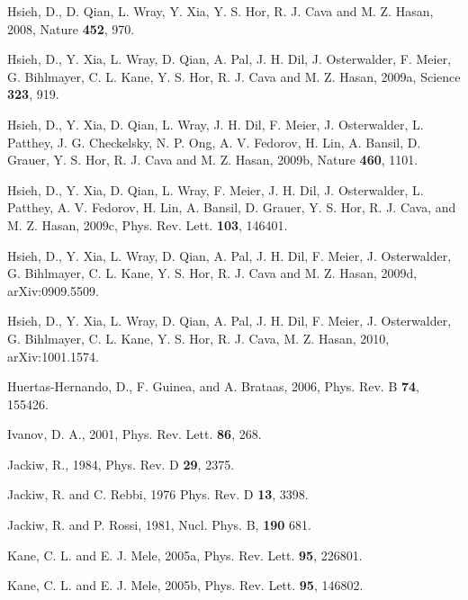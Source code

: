 \documentclass[twocolumn,floatfix,showpacs,rmp,aps]{revtex4}
\begin{document}
\begin{thebibliography}{99}
Hsieh, D., D. Qian, L. Wray, Y. Xia, Y. S. Hor, R. J. Cava and M. Z. Hasan, 2008,
Nature {\bf 452}, 970.

Hsieh, D., Y. Xia, L. Wray, D. Qian, A. Pal, J. H. Dil, J. Osterwalder, F. Meier, G. Bihlmayer,
C. L. Kane, Y. S. Hor, R. J. Cava and M. Z. Hasan, 2009a,
Science {\bf 323}, 919.

Hsieh, D., Y. Xia, D. Qian, L. Wray, J. H. Dil, F. Meier, J. Osterwalder, L. Patthey,
J. G. Checkelsky, N. P. Ong, A. V. Fedorov, H. Lin, A. Bansil, D. Grauer, Y. S. Hor,
R. J. Cava and M. Z. Hasan, 2009b,
Nature {\bf 460}, 1101.

Hsieh, D., Y. Xia, D. Qian, L. Wray, F. Meier, J. H. Dil, J. Osterwalder, L. Patthey,
A. V. Fedorov, H. Lin, A. Bansil, D. Grauer, Y. S. Hor, R. J. Cava, and M. Z. Hasan, 2009c,
Phys. Rev. Lett. {\bf 103}, 146401.

Hsieh, D., Y. Xia, L. Wray, D. Qian, A. Pal, J. H. Dil, F. Meier, J. Osterwalder,
G. Bihlmayer, C. L. Kane, Y. S. Hor, R. J. Cava and M. Z. Hasan, 2009d,
arXiv:0909.5509.

Hsieh, D., Y. Xia, L. Wray, D. Qian, A. Pal, J. H. Dil, F. Meier, J. Osterwalder,
G. Bihlmayer, C. L. Kane, Y. S. Hor, R. J. Cava, M. Z. Hasan, 2010,
arXiv:1001.1574.

Huertas-Hernando, D.,  F. Guinea, and A. Brataas, 2006,
Phys. Rev. B {\bf 74}, 155426.

Ivanov, D. A., 2001,
Phys. Rev. Lett. {\bf 86}, 268.

Jackiw, R., 1984,
Phys. Rev. D {\bf 29}, 2375.

Jackiw, R. and C. Rebbi, 1976
Phys. Rev. D {\bf 13}, 3398.

Jackiw, R. and P. Rossi, 1981,
Nucl. Phys. B, {\bf 190} 681.

Kane, C. L. and E. J. Mele, 2005a,
Phys. Rev. Lett. {\bf 95}, 226801.

Kane, C. L. and E. J. Mele, 2005b,
Phys. Rev. Lett. {\bf 95}, 146802.


\end{thebibliography}
\end{document}
